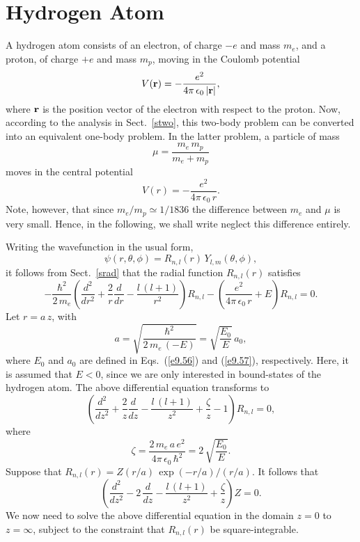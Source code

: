 \section{Hydrogen Atom}\label{s10.4}
A hydrogen atom consists of an electron, of charge $-e$ and mass $m_e$,
and a proton, of charge $+e$ and mass $m_p$,  moving in the Coulomb
potential
\begin{equation}
V({\bf r}) = - \frac{e^2}{4\pi\,\epsilon_0\,|{\bf r}|},
\end{equation}
where ${\bf r}$ is the position vector of the electron with respect to the
proton. Now, according to the analysis in Sect.~\ref{stwo}, this two-body
problem can be converted into an equivalent one-body problem. In the
latter problem, a particle of mass
\begin{equation}
\mu = \frac{m_e\,m_p}{m_e+m_p}
\end{equation}
moves in the central potential
\begin{equation}
V(r) = - \frac{e^2}{4\pi\,\epsilon_0\,r}.
\end{equation}
Note, however, that since $m_e/m_p\simeq 1/1836$ the difference
between $m_e$ and $\mu$ is very small. Hence, in the following,
we shall write neglect this difference entirely.

Writing the wavefunction in the usual form, 
\begin{equation}
\psi(r,\theta,\phi) = R_{n,l}(r)\,Y_{l,m}(\theta,\phi),
\end{equation}
it follows from Sect.~\ref{srad} that the radial function $R_{n,l}(r)$ satisfies
\begin{equation}
-\frac{\hbar^2}{2\,m_e}\left(\frac{d^2}{dr^2} + \frac{2}{r}\frac{d}{dr} -\frac{l\,(l+1)}{r^2}\right) R_{n,l} -\left(\frac{e^2}{4\pi\,\epsilon_0\,r}+E
\right) R_{n,l}= 0.
\end{equation}
Let $r = a\,z$, with
\begin{equation}\label{e9.45}
a = \sqrt{\frac{\hbar^2}{2\,m_e\,(-E)}}=\sqrt{\frac{E_0}{E}}\,a_0,
\end{equation}
where $E_0$ and $a_0$ are defined in Eqs.~(\ref{e9.56}) and (\ref{e9.57}),
respectively.
Here, it is assumed that $E<0$, since we are only interested in bound-states of the hydrogen atom. The above differential equation transforms
to
\begin{equation}
\left(\frac{d^2}{dz^2} + \frac{2}{z}\frac{d}{dz}-\frac{l\,(l+1)}{z^2}+ \frac{\zeta}{z}-1\right)
R_{n,l} = 0,
\end{equation}
where
\begin{equation}\label{e9.47}
\zeta = \frac{2\,m_e\,a\,e^2}{4\pi\,\epsilon_0\,\hbar^2}=2\,\sqrt{\frac{E_0}{E}}.
\end{equation}
Suppose that $R_{n,l}(r) = Z(r/a)\,\exp(-r/a)/(r/a)$. It follows that
\begin{equation}\label{e9.48}
\left(\frac{d^2}{dz^2}  -2\,\frac{d}{dz} - \frac{l\,(l+1)}{z^2} + \frac{\zeta}{z}\right) Z = 0.
\end{equation}
We now need to solve the above differential equation in the domain $z=0$ to $z= \infty$, subject to the constraint that $R_{n,l}(r)$ be square-integrable.


